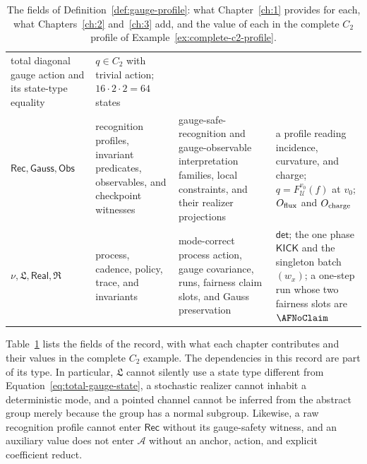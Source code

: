 \begin{table}[!tb]
\begin{tabularx}{\textwidth}{@{}>{\raggedright\arraybackslash}p{}
  >{\raggedright\arraybackslash}p{}
  >{\raggedright\arraybackslash}p{}
  >{\raggedright\arraybackslash}X@{}}
total diagonal gauge action and its state-type equality & $q\in C_2$ with
trivial action; $16\cdot2\cdot2=64$ states\\
$\mathsf{Rec},\mathsf{Gauss},\mathsf{Obs}$ & recognition profiles, invariant
predicates, observables, and checkpoint witnesses & gauge-safe-recognition
and gauge-observable interpretation families, local constraints, and their
realizer projections & a profile reading incidence, curvature, and charge;
$q=F^{v_0}_{\mathcal U}(f)$ at $v_0$; $O_{\rm flux}$ and $O_{\rm charge}$\\
$\nu,\mathfrak L,\mathsf{Real},\mathfrak R$ & process, cadence, policy,
trace, and invariants & mode-correct process action, gauge covariance, runs,
fairness claim slots, and Gauss preservation & $\mathsf{det}$; the one phase
$\mathsf{KICK}$ and the singleton batch $(w_x)$; a one-step run whose two
fairness slots are $\AFNoClaim$\\
\bottomrule
\end{tabularx}
\caption{The fields of Definition~\ref{def:gauge-profile}: what
Chapter~\ref{ch:1} provides for each, what Chapters~\ref{ch:2}
and~\ref{ch:3} add, and the value of each in the complete $C_2$ profile of
Example~\ref{ex:complete-c2-profile}.}
\label{tab:gauge-profile-fields}
\end{table}

Table~\ref{tab:gauge-profile-fields} lists the fields of the record, with
what each chapter contributes and their values in the complete $C_2$ example.
The dependencies in this record are part of its type.  In particular,
$\mathfrak L$ cannot silently use a state type different from
Equation~\eqref{eq:total-gauge-state}, a stochastic realizer cannot inhabit a
deterministic mode, and a pointed channel cannot be inferred from the abstract
group merely because the group has a normal subgroup.  Likewise, a raw
recognition profile cannot enter $\mathsf{Rec}$ without its gauge-safety
witness, and an auxiliary value does not enter $\mathcal A$ without an anchor,
action, and explicit coefficient reduct.

